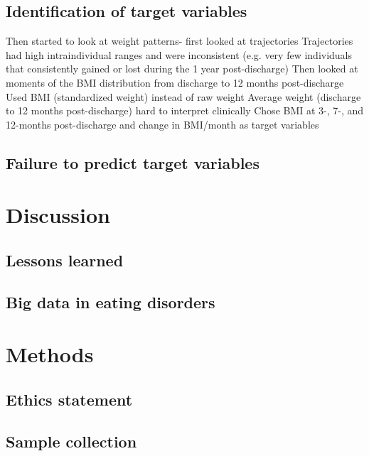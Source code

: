 \subsection{Identification of target variables}\label{measuring-regulatory-noise-in-single-cell-gene-expression-data}

Then started to look at weight patterns- first looked at trajectories
Trajectories had high intraindividual ranges and were inconsistent (e.g. very few individuals that consistently gained or lost during the 1 year post-discharge)
Then looked at moments of the BMI distribution from discharge to 12 months post-discharge
Used BMI (standardized weight) instead of raw weight
Average weight (discharge to 12 months post-discharge) hard to interpret clinically
Chose BMI at 3-, 7-, and 12-months post-discharge and change in BMI/month as target variables

\subsection{Failure to predict target variables}\label{prediction-target-variables}


\section{Discussion}\label{ch04-discussion}

\subsection{Lessons learned}\label{study-design-and-sample-size-for-scrna-seq}

\subsection{Big data in eating disorders}\label{the-limitations-of-the-ercc-spike-in-controls}


\section{Methods}\label{ch04-methods}

\subsection{Ethics statement}\label{ch04-ethics-statement}


\subsection{Sample collection}\label{cell-culture-of-ipscs}


